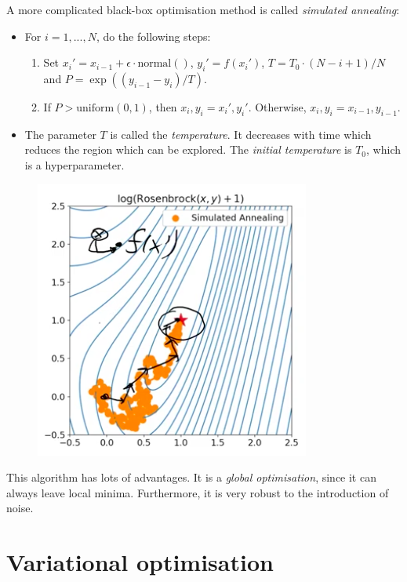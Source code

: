 \minirule

A more complicated black-box optimisation method is called \textit{simulated annealing}:
\begin{itemize}
\item For $i=1,...,N$, do the following steps:
\begin{enumerate}
\item Set $x_i' = x_{i-1} + \epsilon \cdot \textrm{normal}()$, $y_i' = f(x_i')$, $T = T_0 \cdot (N- i + 1)/N$ and $P = \exp((y_{i-1} - y_i)/T)$.
\item If $P > \textrm{uniform}(0,1)$, then $x_i, y_i = x_i', y_i'$. Otherwise, $x_i, y_i = x_{i-1}, y_{i-1}$.
\end{enumerate}
\item The parameter $T$ is called the \textit{temperature}. It decreases with time which reduces the region which can be explored. The \textit{initial temperature} is $T_0$, which is a hyperparameter.
\end{itemize}
\begin{figure}[H]
\centering
\includegraphics[scale=0.4]{simulatedannealing.png}
\end{figure}
This algorithm has lots of advantages. It is a \textit{global optimisation}, since it can always leave local minima. Furthermore, it is very robust to the introduction of noise. 






\newpage
\section{Variational optimisation}


